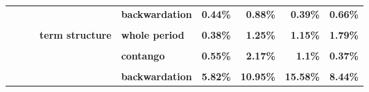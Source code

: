 \documentclass[
  authoryear,
  preprint,
  3p]{elsarticle}
\begin{document}
\begin{landscape}
\begin{longtable}[t]{>{}l>{}l>{}l>{}l>{}l>{}r>{}r>{}r>{}r}
\addlinespace
\textbf{} & \textbf{} & \textbf{} & \textbf{} & \textbf{backwardation} & \textcolor[HTML]{4285f4}{\textbf{0.44\%}} & \textcolor[HTML]{4285f4}{\textbf{0.88\%}} & \textcolor[HTML]{4285f4}{\textbf{0.39\%}} & \textcolor[HTML]{4285f4}{\textbf{0.66\%}}\\
\textbf{\cellcolor{gray!10}{}} & \textbf{\cellcolor{gray!10}{}} & \textbf{\cellcolor{gray!10}{}} & \textbf{\cellcolor{gray!10}{}} & \textbf{\cellcolor{gray!10}{contango}} & \textcolor[HTML]{4285f4}{\textbf{\cellcolor{gray!10}{0.5\%}}} & \textcolor[HTML]{4285f4}{\textbf{\cellcolor{gray!10}{0.3\%}}} & \textcolor[HTML]{4285f4}{\textbf{\cellcolor{gray!10}{0.19\%}}} & \textcolor[HTML]{4285f4}{\textbf{\cellcolor{gray!10}{0.28\%}}}\\
\textbf{} & \textbf{} & \textbf{} & \textbf{term structure} & \textbf{whole period} & \textcolor[HTML]{4285f4}{\textbf{0.38\%}} & \textcolor[HTML]{4285f4}{\textbf{1.25\%}} & \textcolor[HTML]{4285f4}{\textbf{1.15\%}} & \textcolor[HTML]{4285f4}{\textbf{1.79\%}}\\
\textbf{\cellcolor{gray!10}{}} & \textbf{\cellcolor{gray!10}{}} & \textbf{\cellcolor{gray!10}{}} & \textbf{\cellcolor{gray!10}{}} & \textbf{\cellcolor{gray!10}{backwardation}} & \textcolor[HTML]{4285f4}{\textbf{\cellcolor{gray!10}{0.59\%}}} & \textcolor[HTML]{4285f4}{\textbf{\cellcolor{gray!10}{1.09\%}}} & \textcolor[HTML]{4285f4}{\textbf{\cellcolor{gray!10}{1.43\%}}} & \textcolor[HTML]{4285f4}{\textbf{\cellcolor{gray!10}{4.47\%}}}\\
\textbf{} & \textbf{} & \textbf{} & \textbf{} & \textbf{contango} & \textcolor[HTML]{4285f4}{\textbf{0.55\%}} & \textcolor[HTML]{4285f4}{\textbf{2.17\%}} & \textcolor[HTML]{4285f4}{\textbf{1.1\%}} & \textcolor[HTML]{4285f4}{\textbf{0.37\%}}\\
\addlinespace
\textbf{\cellcolor{gray!10}{}} & \textbf{\cellcolor{gray!10}{}} & \textbf{\cellcolor{gray!10}{softs}} & \textbf{\cellcolor{gray!10}{market}} & \textbf{\cellcolor{gray!10}{whole period}} & \textcolor[HTML]{4285f4}{\textbf{\cellcolor{gray!10}{4.78\%}}} & \textcolor[HTML]{4285f4}{\textbf{\cellcolor{gray!10}{9.9\%}}} & \textcolor[HTML]{4285f4}{\textbf{\cellcolor{gray!10}{18.39\%}}} & \textcolor[HTML]{4285f4}{\textbf{\cellcolor{gray!10}{8.48\%}}}\\
\textbf{} & \textbf{} & \textbf{} & \textbf{} & \textbf{backwardation} & \textcolor[HTML]{4285f4}{\textbf{5.82\%}} & \textcolor[HTML]{4285f4}{\textbf{10.95\%}} & \textcolor[HTML]{4285f4}{\textbf{15.58\%}} & \textcolor[HTML]{4285f4}{\textbf{8.44\%}}\\

\end{longtable}
\end{landscape}
\end{document}
